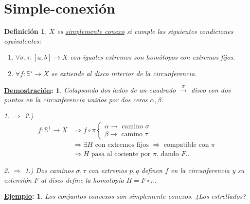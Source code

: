 \documentclass[10pt,a4paper,openright]{book}
\theoremstyle{break}
\newtheorem*{defi}{Definición}
\newtheorem*{demo}{\underline{Demostración}:}
\newtheorem*{ej}{\underline{Ejemplo}:}
\begin{document}
\section{Simple-conexión}%
\label{sec:simple_conexion}
\begin{defi}
$X$ es \underline{simplemente conexo} si cumple las siguientes condiciones equivalentes:
\begin{enumerate}
    \item $\forall \sigma, \tau: \left[ a, b \right] \rightarrow X$ con iguales extremos son homótopos con extremos fijos.
    \item $\forall f: \mathbb{S}' \rightarrow X$ se extiende al disco interior de la circunferencia.
\end{enumerate}
\end{defi}
\begin{demo}
    Colapsando dos lados de un cuadrado $\xrightarrow{\pi}$ disco con dos puntos en la circunferencia unidos por dos ceros $\alpha, \beta$.

    \item 1. $\Rightarrow$ 2.) 
    \begin{align*}
        f: \mathbb{S}^1 \rightarrow X &\Rightarrow f \circ \pi \begin{cases}
            \alpha \rightarrow \text{ camino } \sigma\\
            \beta \rightarrow \text{ camino } \tau
        \end{cases}\\
        &\Rightarrow \exists H \text{ con extremos fijos } \Rightarrow \text{ compatible con } \pi \\
        &\Rightarrow H \text{ pasa al cociente por } \pi \text{, dando } F.
    .\end{align*}

    \item 2. $\Rightarrow$ 1.) Dos caminos $\sigma, \tau$ con extremos $p, q$ definen $f$ en la circunferencia y su extensión $F$ al disco define la homotopía $H = F \circ \pi$.
\end{demo}

\begin{ej}
Los conjuntos convexos son simplemente conexos. ¿Los estrellados?
\end{ej}
\end{document}
